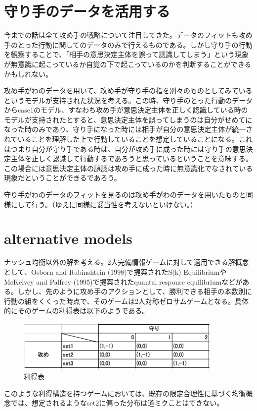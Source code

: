 \documentclass{jsarticle}
\begin{document}
\section{守り手のデータを活用する}
今までの話は全て攻め手の戦略について注目してきた。データのフィットも攻め手のとった行動に関してのデータのみで行えるものである。しかし守り手の行動を観察することで、「相手の意思決定主体を誤って認識してしまう」という現象が無意識に起こっているか自覚の下で起こっているのかを判断することができるかもしれない。

攻め手がわのデータを用いて、攻め手が守り手の指を別々のものとしてみているというモデルが支持された状況を考える。この時、守り手のとった行動のデータからcase1のモデル、すなわち攻め手が意思決定主体を正しく認識している時のモデルが支持されたとすると、意思決定主体を誤ってしまうのは自分がせめてになった時のみであり、守り手になった時には相手が自分の意思決定主体が統一されていることを理解した上で行動していることを想定していることになる。これはつまり自分が守り手である時は、自分が攻め手に成った時には守り手の意思決定主体を正しく認識して行動するであろうと思っているということを意味する。この場合には意思決定主体の誤認は攻め手に成った時に無意識化でなされている現象だということができるであろう。

守り手がわのデータのフィットを見るのは攻め手がわのデータを用いたものと同様にして行う。（ゆえに同様に妥当性を考えないといけない。）

\section{alternative models}
ナッシュ均衡以外の解を考える。2人完備情報ゲームに対して適用できる解概念として、Osborn and Rubinshtein (1998)で提案されたS(k) EquilibriumやMcKelvey and Palfrey (1995)で提案されたquantal response equilibriumなどがある。しかし、先のように攻め手のアクションとして、勝利できる相手の本数別に行動の組をくくった時点で、そのゲームは2人対称ゼロサムゲームとなる。具体的にそのゲームの利得表は以下のようである。
\begin{figure}[h]
    \centering
    \includegraphics[width=10cm]{pmat.png}
    \caption{利得表}
\end{figure}
このような利得構造を持つゲームにおいては、既存の限定合理性に基づく均衡概念では、想定されるようなset2に偏った分布は道ミクことはできない。
\end{document}
